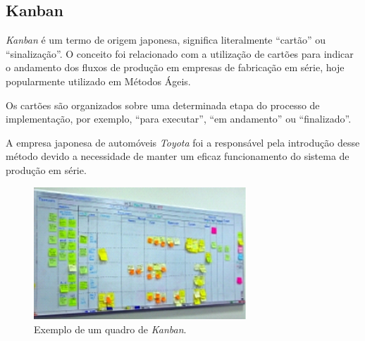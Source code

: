 \subsection{Kanban}
\par \emph{Kanban} é um termo de origem japonesa, significa literalmente ``cartão'' ou ``sinalização''. O conceito foi relacionado com a utilização de cartões para indicar o andamento dos fluxos de produção em empresas de fabricação em série, hoje popularmente utilizado em Métodos Ágeis.
\par Os cartões são organizados sobre uma determinada etapa do processo de implementação, por exemplo, ``para executar'', ``em andamento'' ou ``finalizado''.
\par A empresa japonesa de automóveis \emph{Toyota} foi a responsável pela introdução desse método devido a necessidade de manter um eficaz funcionamento do sistema de produção em série.
\begin{figure}[!htb]
\centering
\includegraphics[width=8cm]{figuras/kanban_exemplo}
\caption{\label{fig:kanban_exemplo}Exemplo de um quadro de \emph{Kanban}.}
\end{figure}

